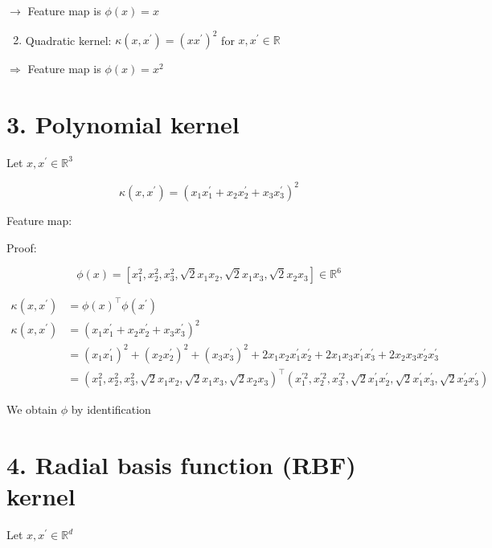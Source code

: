 $\rightarrow$ Feature map is $\phi(x)=x$

\begin{enumerate}
  \setcounter{enumi}{1}
  \item Quadratic kernel: $\kappa\left(x, x^{\prime}\right)=\left(x x^{\prime}\right)^{2}$ for $x, x^{\prime} \in \mathbb{R}$
\end{enumerate}

$\Rightarrow$ Feature map is $\phi(x)=x^{2}$

\section*{3. Polynomial kernel}
Let $x, x^{\prime} \in \mathbb{R}^{3}$

$$
\kappa\left(x, x^{\prime}\right)=\left(x_{1} x_{1}^{\prime}+x_{2} x_{2}^{\prime}+x_{3} x_{3}^{\prime}\right)^{2}
$$

Feature map:

Proof:

$$
\phi(x)=\left[x_{1}^{2}, x_{2}^{2}, x_{3}^{2}, \sqrt{2} x_{1} x_{2}, \sqrt{2} x_{1} x_{3}, \sqrt{2} x_{2} x_{3}\right] \in \mathbb{R}^{6}
$$

$$
\begin{aligned}
\kappa\left(x, x^{\prime}\right) & =\phi(x)^{\top} \phi\left(x^{\prime}\right) \\
\kappa\left(x, x^{\prime}\right) & =\left(x_{1} x_{1}^{\prime}+x_{2} x_{2}^{\prime}+x_{3} x_{3}^{\prime}\right)^{2} \\
& =\left(x_{1} x_{1}^{\prime}\right)^{2}+\left(x_{2} x_{2}^{\prime}\right)^{2}+\left(x_{3} x_{3}^{\prime}\right)^{2}+2 x_{1} x_{2} x_{1}^{\prime} x_{2}^{\prime}+2 x_{1} x_{3} x_{1}^{\prime} x_{3}^{\prime}+2 x_{2} x_{3} x_{2}^{\prime} x_{3}^{\prime} \\
& =\left(x_{1}^{2}, x_{2}^{2}, x_{3}^{2}, \sqrt{2} x_{1} x_{2}, \sqrt{2} x_{1} x_{3}, \sqrt{2} x_{2} x_{3}\right)^{\top}\left(x_{1}^{\prime 2}, x_{2}^{\prime 2}, x_{3}^{\prime 2}, \sqrt{2} x_{1}^{\prime} x_{2}^{\prime}, \sqrt{2} x_{1}^{\prime} x_{3}^{\prime}, \sqrt{2} x_{2}^{\prime} x_{3}^{\prime}\right)
\end{aligned}
$$

We obtain $\phi$ by identification

\section*{4. Radial basis function (RBF) kernel}
Let $x, x^{\prime} \in \mathbb{R}^{d}$

